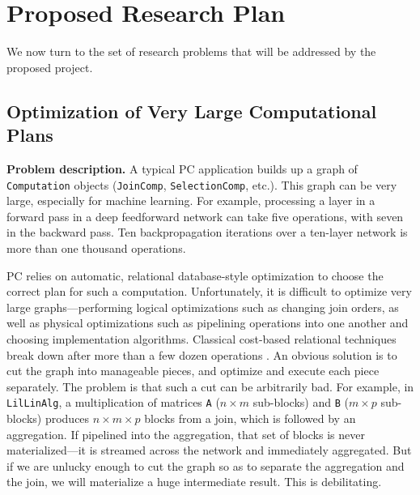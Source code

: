 
\section{Proposed Research Plan}

We now turn to the set of research
problems that will be addressed by the proposed project.

\subsection{Optimization of Very Large Computational Plans}

\noindent
\textbf{Problem description.}
A typical PC application builds up a graph of \texttt{Computation} objects (\texttt{JoinComp}, \texttt{SelectionComp}, etc.).  
This graph can be very large, especially for machine learning.  For example, 
processing a layer in a forward pass in a deep feedforward network can take five operations, with seven
in the backward pass.  Ten backpropagation iterations over a ten-layer network is more than one thousand operations.

PC relies on automatic, relational database-style optimization to choose the correct plan for such a computation.
Unfortunately, it is difficult to optimize very large graphs---performing logical optimizations such as 
changing join orders, as well as physical optimizations such as pipelining operations into one another and choosing implementation
algorithms.  Classical cost-based
relational techniques \cite{selinger1979access} break down after more than a few dozen operations \cite{graefe1993volcano}.
An obvious solution is to cut the graph into manageable pieces, and optimize and execute each piece separately.
The problem is that such a cut can be arbitrarily bad.  For example, in \texttt{LilLinAlg},
a multiplication of matrices \texttt{A} ($n\times m$ sub-blocks)
and \texttt{B} ($m\times p$ sub-blocks) 
produces $n \times m \times p$ blocks from a join, which is followed by an aggregation.  If pipelined into the aggregation, that set
of blocks is never materialized---it is streamed across the network and immediately aggregated.  
But if we are unlucky enough to cut the graph so as to separate the aggregation and the
join, we will materialize a huge intermediate result.  This is debilitating.

